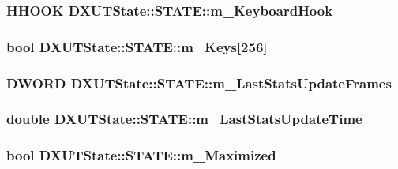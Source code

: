 \label{struct_d_x_u_t_state_1_1_s_t_a_t_e_aa4047cd7134c8af8e567720e521992c5}
\hypertarget{struct_d_x_u_t_state_1_1_s_t_a_t_e_ae77d30129b56d705a0b926181cfa1669}{
\subsubsection[{m\_\-KeyboardHook}]{\setlength{\rightskip}{0pt plus 5cm}HHOOK {\bf DXUTState::STATE::m\_\-KeyboardHook}}}
\label{struct_d_x_u_t_state_1_1_s_t_a_t_e_ae77d30129b56d705a0b926181cfa1669}
\hypertarget{struct_d_x_u_t_state_1_1_s_t_a_t_e_a55465563b5a34df8c923c1ed0c169c9a}{
\subsubsection[{m\_\-Keys}]{\setlength{\rightskip}{0pt plus 5cm}bool {\bf DXUTState::STATE::m\_\-Keys}\mbox{[}256\mbox{]}}}
\label{struct_d_x_u_t_state_1_1_s_t_a_t_e_a55465563b5a34df8c923c1ed0c169c9a}
\hypertarget{struct_d_x_u_t_state_1_1_s_t_a_t_e_af2da3ea30f88e1495ada8b7fe913b698}{
\subsubsection[{m\_\-LastStatsUpdateFrames}]{\setlength{\rightskip}{0pt plus 5cm}DWORD {\bf DXUTState::STATE::m\_\-LastStatsUpdateFrames}}}
\label{struct_d_x_u_t_state_1_1_s_t_a_t_e_af2da3ea30f88e1495ada8b7fe913b698}
\hypertarget{struct_d_x_u_t_state_1_1_s_t_a_t_e_a7b004ce686d86fa27c8861ed837f9fed}{
\subsubsection[{m\_\-LastStatsUpdateTime}]{\setlength{\rightskip}{0pt plus 5cm}double {\bf DXUTState::STATE::m\_\-LastStatsUpdateTime}}}
\label{struct_d_x_u_t_state_1_1_s_t_a_t_e_a7b004ce686d86fa27c8861ed837f9fed}
\hypertarget{struct_d_x_u_t_state_1_1_s_t_a_t_e_a0528d57af4408b8bb0e541d70efffea9}{
\subsubsection[{m\_\-Maximized}]{\setlength{\rightskip}{0pt plus 5cm}bool {\bf DXUTState::STATE::m\_\-Maximized}}}
